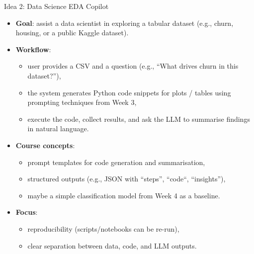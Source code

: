 \documentclass[aspectratio=169]{beamer}
\begin{document}
\begin{frame}{Idea 2: Data Science EDA Copilot}
  \begin{itemize}
    \item \textbf{Goal}: assist a data scientist in exploring a tabular dataset (e.g., churn, housing, or a public Kaggle dataset).
    \item \textbf{Workflow}:
      \begin{itemize}
        \item user provides a CSV and a question (e.g., ``What drives churn in this dataset?''),
        \item the system generates Python code snippets for plots / tables using prompting techniques from Week 3,
        \item execute the code, collect results, and ask the LLM to summarise findings in natural language.
      \end{itemize}
    \item \textbf{Course concepts}:
      \begin{itemize}
        \item prompt templates for code generation and summarisation,
        \item structured outputs (e.g., JSON with ``steps'', ``code``, ``insights''),
        \item maybe a simple classification model from Week 4 as a baseline.
      \end{itemize}
    \item \textbf{Focus}:
      \begin{itemize}
        \item reproducibility (scripts/notebooks can be re-run),
        \item clear separation between data, code, and LLM outputs.
      \end{itemize}
  \end{itemize}
\end{frame}
\end{document}
